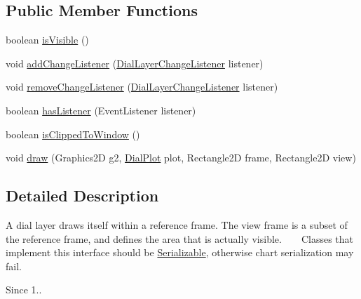 \subsection*{Public Member Functions}
\begin{DoxyCompactItemize}
\item 
boolean \mbox{\hyperlink{interfaceorg_1_1jfree_1_1chart_1_1plot_1_1dial_1_1_dial_layer_a54a8415c6f856c550d1b92cf3139731d}{is\+Visible}} ()
\item 
void \mbox{\hyperlink{interfaceorg_1_1jfree_1_1chart_1_1plot_1_1dial_1_1_dial_layer_a6a2e5bdf252099b17e57f3685db6e2e4}{add\+Change\+Listener}} (\mbox{\hyperlink{interfaceorg_1_1jfree_1_1chart_1_1plot_1_1dial_1_1_dial_layer_change_listener}{Dial\+Layer\+Change\+Listener}} listener)
\item 
void \mbox{\hyperlink{interfaceorg_1_1jfree_1_1chart_1_1plot_1_1dial_1_1_dial_layer_a8c8d3fc6fc08c79c96bd216e9af5a28a}{remove\+Change\+Listener}} (\mbox{\hyperlink{interfaceorg_1_1jfree_1_1chart_1_1plot_1_1dial_1_1_dial_layer_change_listener}{Dial\+Layer\+Change\+Listener}} listener)
\item 
boolean \mbox{\hyperlink{interfaceorg_1_1jfree_1_1chart_1_1plot_1_1dial_1_1_dial_layer_a53485b27b00963044045bc0f20820dea}{has\+Listener}} (Event\+Listener listener)
\item 
boolean \mbox{\hyperlink{interfaceorg_1_1jfree_1_1chart_1_1plot_1_1dial_1_1_dial_layer_a822eeadbe31b48827497714abeda2190}{is\+Clipped\+To\+Window}} ()
\item 
void \mbox{\hyperlink{interfaceorg_1_1jfree_1_1chart_1_1plot_1_1dial_1_1_dial_layer_aa4564e018317f0fdc7dbe85a46e7a4a4}{draw}} (Graphics2D g2, \mbox{\hyperlink{classorg_1_1jfree_1_1chart_1_1plot_1_1dial_1_1_dial_plot}{Dial\+Plot}} plot, Rectangle2D frame, Rectangle2D view)
\end{DoxyCompactItemize}


\subsection{Detailed Description}
A dial layer draws itself within a reference frame. The view frame is a subset of the reference frame, and defines the area that is actually visible. ~\newline
~\newline
 Classes that implement this interface should be \mbox{\hyperlink{}{Serializable}}, otherwise chart serialization may fail.

\begin{DoxySince}{Since}
1.. 
\end{DoxySince}


